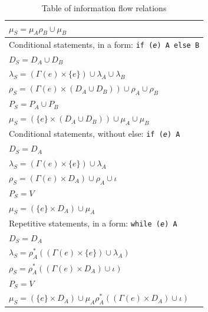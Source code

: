 \documentclass[oneside,12pt,a4paper]{book}
\begin{document}
\begin{table}[h]
\begin{tabular}{l}
$\mu_S = \mu_A\rho_B \cup \mu_B$                                                            \\
\hline                                                                                      
Conditional statements, in a form: \texttt{if (\textit{e}) A else B}                        \\
$D_S = D_A \cup D_B$                                                                        \\
$\lambda_S = (\Gamma(e) \times \{e\}) \cup \lambda_A \cup \lambda_B$                        \\
$\rho_S = (\Gamma(e) \times (D_A \cup D_B)) \cup \rho_A \cup \rho_B$                        \\
$P_S = P_A \cup P_B$                                                                        \\
$\mu_S = (\{e\} \times (D_A \cup D_B)) \cup \mu_A \cup \mu_B$                               \\
\hline                                                                                      
Conditional statements, without else: \texttt{if (\textit{e}) A}                            \\
$D_S = D_A$                                                                                 \\
$\lambda_S = (\Gamma(e) \times \{e\}) \cup \lambda_A$                                       \\
$\rho_S = (\Gamma(e) \times D_A) \cup \rho_A \cup \iota$                                    \\
$P_S = V$                                                                                   \\
$\mu_S = (\{e\} \times D_A) \cup \mu_A$                                                     \\
\hline                                                                                      
Repetitive statements, in a form: \texttt{while (\textit{e}) A}                             \\
$D_S = D_A$                                                                                 \\
$\lambda_S = \rho^*_A((\Gamma(e) \times \{e\}) \cup \lambda_A)$                   \\
$\rho_S = \rho^*_A((\Gamma(e) \times D_A) \cup \iota)$                            \\
$P_S = V$                                                                                   \\
$\mu_S = (\{e\} \times D_A) \cup \mu_A\rho^*_A((\Gamma(e) \times D_A) \cup \iota)$\\
  \end{tabular}
  \caption{Table of information flow relations}
  \label{tab:informationFlowTable}
\end{table}
\end{document}
